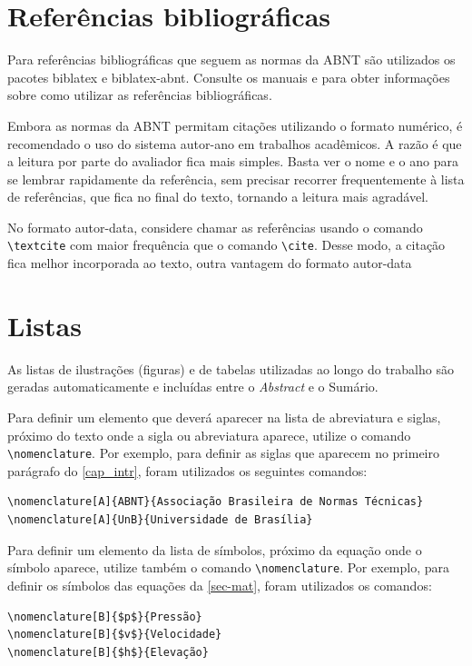 \section{Referências bibliográficas}

Para referências bibliográficas que seguem as normas da ABNT são utilizados os pacotes \textsf{biblatex} e \textsf{biblatex-abnt}. Consulte os manuais \textcite{biblatex} e \textcite{biblatexabnt} para obter informações sobre como utilizar as referências bibliográficas.

Embora as normas da ABNT permitam citações utilizando o formato numérico, é recomendado o uso do sistema autor-ano em trabalhos acadêmicos. A razão é que a leitura por parte do avaliador fica mais simples. Basta ver o nome e o ano para se lembrar rapidamente da referência, sem precisar recorrer frequentemente à lista de referências, que fica no final do texto, tornando a leitura mais agradável.

No formato autor-data, considere chamar as referências usando o comando \verb|\textcite| com maior frequência que o comando \verb|\cite|. Desse modo, a citação fica melhor incorporada ao texto, outra vantagem do formato autor-data

\section{Listas}

As listas de ilustrações (figuras) e de tabelas utilizadas ao longo do trabalho são geradas automaticamente e incluídas entre o \emph{Abstract} e o Sumário.

Para definir um elemento que deverá aparecer na lista de abreviatura e siglas, próximo do texto onde a sigla ou abreviatura aparece, utilize o comando \verb|\nomenclature|. Por exemplo, para definir as siglas que aparecem no primeiro parágrafo do \autoref{cap_intr}, foram utilizados os seguintes comandos:

\begin{verbatim}
\nomenclature[A]{ABNT}{Associação Brasileira de Normas Técnicas}
\nomenclature[A]{UnB}{Universidade de Brasília}
\end{verbatim}

Para definir um elemento da lista de símbolos, próximo da equação onde o símbolo aparece, utilize também o comando \verb|\nomenclature|. Por exemplo, para definir os símbolos das equações da \autoref{sec-mat}, foram utilizados os comandos:

\begin{verbatim}
\nomenclature[B]{$p$}{Pressão}
\nomenclature[B]{$v$}{Velocidade}
\nomenclature[B]{$h$}{Elevação}
\end{verbatim}

